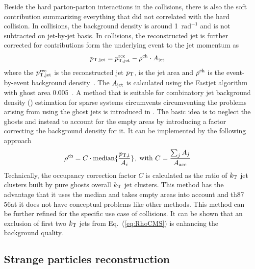 Beside the hard parton-parton interactions in the collisions, there is also the soft contribution summarizing everything that did not correlated with the hard collision. In \pp collisions, the background density is around 1~\GeVc $\mathrm{rad^{-1}}$  and is not subtracted on jet-by-jet basis. In \pPb collisions, the reconstructed jet is further corrected for contributions form the underlying event to the jet momentum as  
\begin{equation}
	p_{\rm T,jet} = p_{\rm T,jet}^{\rm rec} - \rho^{\rm ch}\cdot A_{\rm jet}
	\label{eq:DeltaPt}
\end{equation}
where the $p_{\rm T,jet}^{\rm rec}$ is the reconstructed jet $p_{\rm T}$, \Ajet is the jet area and $\rho^{\rm ch}$ is the event-by-event background density~\cite{Cacciari:2007fd}. The $A_{\rm jet}$ is calculated using the Fastjet algorithm with ghost area 0.005~\cite{Cacciari:2008gn}. A method that is suitable for combinatory jet background density (\rhoj) estimation for sparse systems circumvents circumventing the problems arising from using the ghost jets is introduced in \cite{Chatrchyan:2012tt}.
The basic idea is to neglect the ghosts and instead to account for the empty areas by introducing a factor correcting the background density for it.
It can be implemented by the following approach
\begin{equation}
	\rho^{\rm ch} = C\cdot{\rm median}\{\frac{p_{\rm T,i}}{A_{i}}\},~{\rm with}~C = \frac{\sum_{j} A_{j}}{A_\mathrm{acc}}
	\label{eq:RhoCMS}
\end{equation}
Technically, the occupancy correction factor $C$ is calculated as the ratio of $k_{\rm T}$ jet clusters built by pure ghosts overall $k_{\rm T}$ jet clusters. This method has the advantage that it uses the median and takes empty areas into account and th87
56at it does not have conceptual problems like other methods. This method can be further refined for the specific use case of \pPb collisions.
It can be shown that an exclusion of first two $k_{\rm T}$ jets from Eq.~(\ref{eq:RhoCMS}) is enhancing the background quality.

\subsection{Strange particles reconstruction}
\label{SubSec:ParRec}

